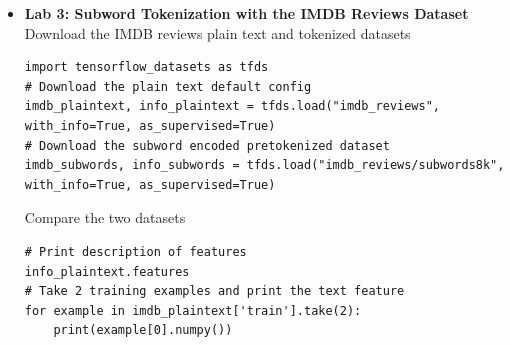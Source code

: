 \documentclass[20pt]{article}
\begin{document}
\begin{itemize}
\begin{verbatim}
# -> Visualize the Results
import matplotlib.pyplot as plt
# Plot utility
def plot_graphs(history, string):
plt.plot(history.history[string])
plt.plot(history.history['val_'+string])
plt.xlabel("Epochs")
plt.ylabel(string)
plt.legend([string, 'val_'+string])
plt.show()
# Plot the accuracy and loss
plot_graphs(history, "accuracy")
plot_graphs(history, "loss")
		\end{verbatim}
		\texttt{[image: c3w2\\\_lab2.png]}
		\begin{verbatim}
# -> Visualize Word Embeddings
# using the Tensorflow Embedding Projector
# Get the index-word dictionary
reverse_word_index = tokenizer.index_word
# Get the embedding layer from the model (i.e. first layer)
embedding_layer = model.layers[0]
# Get the weights of the embedding layer
embedding_weights = embedding_layer.get_weights()[0]
# Print the shape. Expected is (vocab_size, embedding_dim)
print(embedding_weights.shape) 

import io
# Open writeable files
out_v = io.open('vecs.tsv', 'w', encoding='utf-8')
out_m = io.open('meta.tsv', 'w', encoding='utf-8')
# Initialize the loop. Start counting at `1` because `0` is just for the padding
for word_num in range(1, vocab_size):
# Get the word associated at the current index
word_name = reverse_word_index[word_num]
# Get the embedding weights associated with the current index
word_embedding = embedding_weights[word_num]
# Write the word name
out_m.write(word_name + "\n")
# Write the word embedding
out_v.write('\t'.join([str(x) for x in word_embedding]) + "\n")
# Close the files
out_v.close()
out_m.close()

# Download the files (???)
files.download('vecs.tsv')
files.download('meta.tsv')
		\end{verbatim}
		So far, tokenizing datasets from scratch we treating the \textbf{vocab size as a hyperparameter}. Furthermore, we're tokenizing the texts by building a vocabulary of full words. In the next lab, we will make use of a \textbf{pre-tokenized dataset} that uses a vocabulary of subwords.
		\item \textbf{Lab 3: Subword Tokenization with the IMDB Reviews Dataset}\\
		Download the IMDB reviews plain text and tokenized datasets
		\begin{verbatim}
import tensorflow_datasets as tfds
# Download the plain text default config
imdb_plaintext, info_plaintext = tfds.load("imdb_reviews", with_info=True, as_supervised=True)
# Download the subword encoded pretokenized dataset
imdb_subwords, info_subwords = tfds.load("imdb_reviews/subwords8k", with_info=True, as_supervised=True)
		\end{verbatim}
		Compare the two datasets
		\begin{verbatim}
# Print description of features
info_plaintext.features
# Take 2 training examples and print the text feature
for example in imdb_plaintext['train'].take(2):
	print(example[0].numpy())


\end{verbatim}
\end{itemize}
\end{document}
